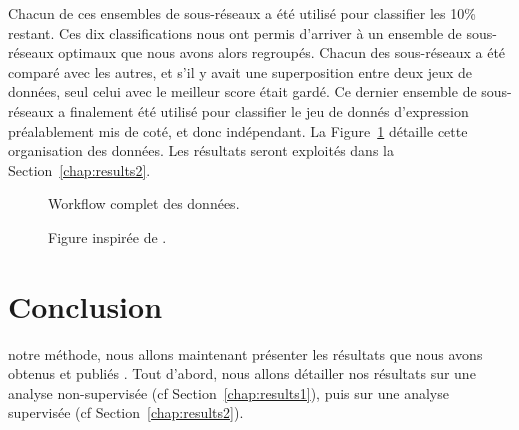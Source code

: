 			Chacun de ces ensembles de sous-réseaux a été utilisé pour classifier les 10\% restant.
			Ces dix classifications nous ont permis d'arriver à un ensemble de sous-réseaux optimaux que nous avons alors regroupés.
			Chacun des sous-réseaux a été comparé avec les autres, et s'il y avait une superposition entre deux jeux de données, seul celui avec le meilleur score était gardé.
			Ce dernier ensemble de sous-réseaux a finalement été utilisé pour classifier le jeu de donnés d'expression préalablement mis de coté, et donc indépendant.
			La Figure~\ref{fig:Workflow} détaille cette organisation des données.
			Les résultats seront exploités dans la Section~\ref{chap:results2}.

			\begin{figure}
				\begin{center}
					\def\svgwidth{\columnwidth}
					\caption{Workflow complet des données.}
					\label{fig:Workflow}
				\end{center}
				\caption*{Figure inspirée de \citeauthor{Garcia2012}.}
			\end{figure}

\pagebreak

	\section{\textcolor{green!45!black}{Conclusion}}
		 notre méthode, nous allons maintenant présenter les résultats que nous avons obtenus et publiés \citet{Garcia2011,Garcia2012}. Tout d'abord, nous allons détailler nos résultats sur une analyse non-supervisée (cf Section~\ref{chap:results1}), puis sur une analyse supervisée (cf Section~\ref{chap:results2}).
